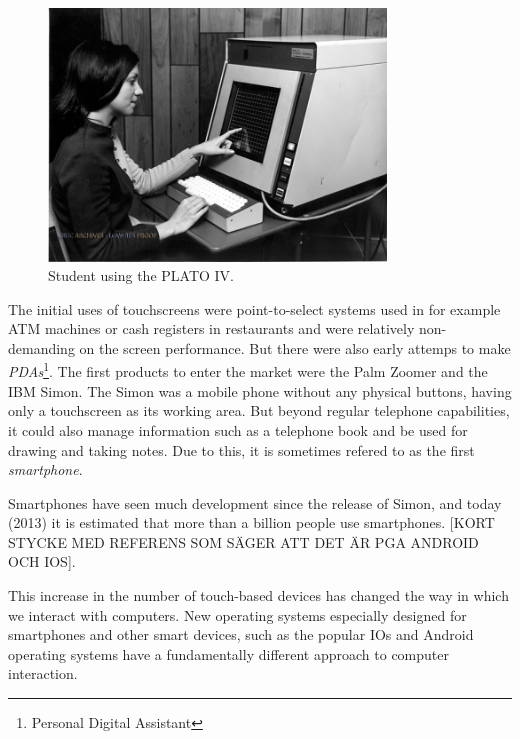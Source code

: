 \begin{figure}[]
\includegraphics[width=0.8\textwidth] {bilder/platoiv.jpg}
\caption{Student using the PLATO IV.}
\label{platoIV}
\end{figure}


The initial uses of touchscreens were point-to-select systems used in for example ATM machines or cash registers in restaurants and were relatively non-demanding on the screen performance\cite{buxton}. But there were also early attemps to make \emph{PDAs}\footnote{Personal Digital Assistant}. The first products to enter the market were the Palm Zoomer and the IBM Simon. The Simon was a mobile phone without any physical buttons, having only a touchscreen as its working area. But beyond regular telephone capabilities, it could also manage information such as a telephone book and be used for drawing and taking notes. Due to this, it is sometimes refered to as the first \emph{smartphone}\cite{buxton}.

Smartphones have seen much development since the release of Simon, and today (2013) it is estimated that more than a billion people use smartphones\cite{billion1}\cite{billion2}. [KORT STYCKE MED REFERENS SOM SÄGER ATT DET ÄR PGA ANDROID OCH IOS]. 

This increase in the number of touch-based devices has changed the way in which we interact with computers. New operating systems especially designed for smartphones and other smart devices, such as the popular IOs and Android operating systems have a fundamentally different approach to computer interaction.

